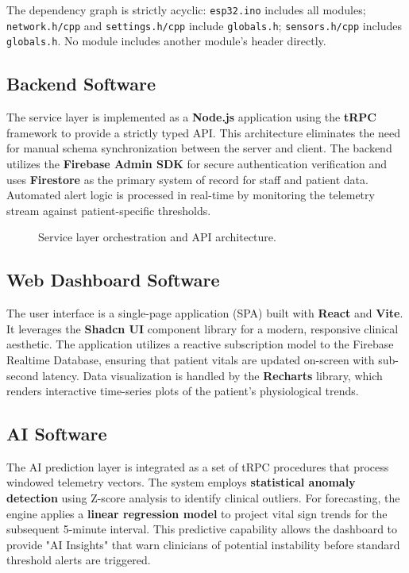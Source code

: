 The dependency graph is strictly acyclic: \texttt{esp32.ino} includes all modules;
\texttt{network.h/cpp} and \texttt{settings.h/cpp} include \texttt{globals.h};
\texttt{sensors.h/cpp} includes \texttt{globals.h}.
No module includes another module's header directly.

\subsection*{Backend Software}
The service layer is implemented as a \textbf{Node.js} application using the \textbf{tRPC} framework to provide a strictly typed API. This architecture eliminates the need for manual schema synchronization between the server and client. The backend utilizes the \textbf{Firebase Admin SDK} for secure authentication verification and uses \textbf{Firestore} as the primary system of record for staff and patient data. Automated alert logic is processed in real-time by monitoring the telemetry stream against patient-specific thresholds.

\begin{figure}[H]
    \centering
    \caption{Service layer orchestration and API architecture.}
    \label{fig:backend_arch}
\end{figure}

\subsection*{Web Dashboard Software}
The user interface is a single-page application (SPA) built with \textbf{React} and \textbf{Vite}. It leverages the \textbf{Shadcn UI} component library for a modern, responsive clinical aesthetic. The application utilizes a reactive subscription model to the Firebase Realtime Database, ensuring that patient vitals are updated on-screen with sub-second latency. Data visualization is handled by the \textbf{Recharts} library, which renders interactive time-series plots of the patient's physiological trends.

\subsection*{AI Software}
The AI prediction layer is integrated as a set of tRPC procedures that process windowed telemetry vectors. The system employs \textbf{statistical anomaly detection} using Z-score analysis to identify clinical outliers. For forecasting, the engine applies a \textbf{linear regression model} to project vital sign trends for the subsequent 5-minute interval. This predictive capability allows the dashboard to provide "AI Insights" that warn clinicians of potential instability before standard threshold alerts are triggered.

